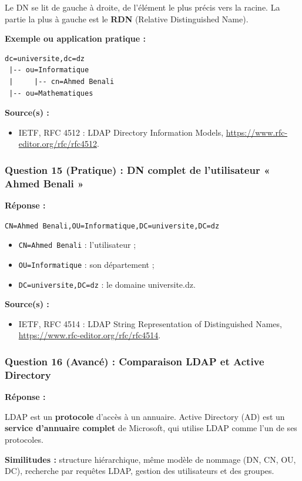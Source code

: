 \documentclass[12pt,a4paper]{article}
\newcommand{\reponse}{\textbf{Réponse :}\par}
\newcommand{\exemple}{\textbf{Exemple ou application pratique :}\par}
\newcommand{\sources}{\textbf{Source(s) :}}
\begin{document}
Le DN se lit de gauche à droite, de l'élément le plus précis vers la
racine. La partie la plus à gauche est le \textbf{RDN} (Relative
Distinguished Name).

\exemple
\begin{verbatim}
dc=universite,dc=dz
 |-- ou=Informatique
 |     |-- cn=Ahmed Benali
 |-- ou=Mathematiques
\end{verbatim}

\sources
\begin{itemize}
    \item IETF, RFC 4512 : LDAP Directory Information Models,
    \url{https://www.rfc-editor.org/rfc/rfc4512}.
\end{itemize}

\subsubsection*{Question 15 (Pratique) : DN complet de l'utilisateur « Ahmed Benali »}

\reponse
\begin{center}
\texttt{CN=Ahmed Benali,OU=Informatique,DC=universite,DC=dz}
\end{center}

\begin{itemize}
    \item \texttt{CN=Ahmed Benali} : l'utilisateur ;
    \item \texttt{OU=Informatique} : son département ;
    \item \texttt{DC=universite,DC=dz} : le domaine universite.dz.
\end{itemize}

\sources
\begin{itemize}
    \item IETF, RFC 4514 : LDAP String Representation of Distinguished
    Names, \url{https://www.rfc-editor.org/rfc/rfc4514}.
\end{itemize}

\subsubsection*{Question 16 (Avancé) : Comparaison LDAP et Active Directory}

\reponse
LDAP est un \textbf{protocole} d'accès à un annuaire. Active Directory
(AD) est un \textbf{service d'annuaire complet} de Microsoft, qui
utilise LDAP comme l'un de ses protocoles.

\textbf{Similitudes :} structure hiérarchique, même modèle de nommage
(DN, CN, OU, DC), recherche par requêtes LDAP, gestion des utilisateurs
et des groupes.
\end{document}
